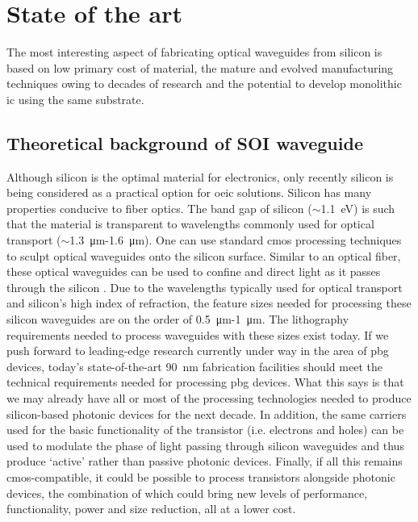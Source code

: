 \documentclass[../report.tex]{subfiles}
\begin{document}
	
	
\chapter{State of the art}
The most interesting aspect of fabricating optical waveguides from silicon is based on low primary cost of material, the mature and evolved manufacturing techniques owing to decades of research and the potential to develop monolithic \gls{ic} using the same substrate.

	\section{Theoretical background of SOI waveguide}
Although silicon is the optimal material for electronics, only recently silicon is being considered as a practical option for \gls{oeic} solutions. Silicon has many properties conducive to fiber optics. The band gap of silicon ($\sim$\SI{1.1}{\electronvolt}) is such that the material is transparent to wavelengths commonly used for optical transport ($\sim$\SI{1.3}{\micro\metre}-\SI{1.6}{\micro\metre}). One can use standard \gls{cmos} processing techniques to sculpt optical waveguides onto the silicon surface. Similar to an optical fiber, these optical waveguides can be used to confine and direct light as it passes through the silicon \cite{reed_silicon_2004}. Due to the wavelengths typically used for optical transport and silicon’s high index of refraction, the feature sizes needed for processing these silicon waveguides are on the order of \SI{0.5}{\micro\metre}-\SI{1}{\micro\metre}. The lithography requirements needed to process waveguides with these sizes exist today. If we push forward to leading-edge research currently under way in the area of \gls{pbg} devices, today’s state-of-the-art \SI{90}{\nano\metre} fabrication facilities should meet the technical requirements needed for processing \gls{pbg} devices. What this says is that we may already have all or most of the processing technologies needed to produce silicon-based photonic devices for the next decade. In addition, the same carriers used for the basic functionality of the transistor (i.e. electrons and holes) can be used to modulate the phase of light passing through silicon waveguides and thus produce ‘active’ rather than passive photonic devices. Finally, if all this remains \gls{cmos}-compatible, it could be possible to process transistors alongside photonic devices, the combination of which could bring new levels of performance, functionality, power and size reduction, all at a lower cost.
		
\end{document}
